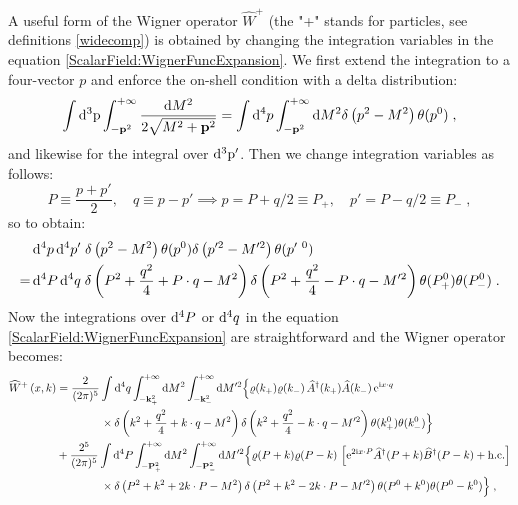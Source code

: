 \documentclass[prd,superscriptaddress,nofootinbib,notitlepage]{revtex4-1}
\def\wA{{\widehat A}}
\def\wA{\widehat A}
\def\wAd{\widehat A^{\dagger}}
\def\wBd{\widehat B^{\dagger}}
\def\wW{\widehat W}
\newcommand{\e}{{\rm e}}
\newcommand{\pp}{{\rm p}}
\newcommand{\di}{{\rm d}}
\newcommand{\ii}{{\rm i}}
\begin{document}
A useful form of the Wigner operator $\wW^+$ (the "+" stands for particles, see definitions \eqref{widecomp}) is obtained by changing 
the integration variables in the equation \eqref{ScalarField:WignerFuncExpansion}. We first extend the integration to a 
four-vector $p$ and enforce the on-shell condition with a delta distribution:
%
\begin{equation*}
    \int\di^3\pp\int^{+\infty}_{-{\bf p}^2}\frac{\di M^2}{2\sqrt{M^2+{\bf p}^2}}=\int\di^4 p
    \int^{+\infty}_{-{\bf p}^2}\di M^2\delta\left(p^2-M^2\right)\theta(p^0)\;,
\end{equation*}
%
and likewise for the integral over $\di^3\pp'$. Then we change integration variables as follows:
%
\begin{equation*}
    P\equiv\frac{p+p'}{2},\quad q\equiv p-p' \implies p=P+q/2 \equiv P_+,\quad p'=P-q/2 \equiv P_-\;,
\end{equation*}
%
so to obtain:
%
\begin{align*}
  & \di^4 p \, \di^4 p' \; \delta\left(p^2-M^2\right)\theta(p^0) \delta\left(p'^2-M'^2\right)\theta(p^{\prime\ 0}) \\
   =\, & \di^4 P \, \di^4 q \; \delta\left(P^2+\frac{q^2}{4}+P\cdot q-M^2\right)\delta\left(P^2+\frac{q^2}{4}
   -P\cdot q-M'^2\right)\theta(P^0_+)\theta(P^0_-)\;.
\end{align*}
%
Now the integrations over $\di^4 P$ or $\di^4 q$ in the equation \eqref{ScalarField:WignerFuncExpansion}
are straightforward and the Wigner operator becomes:
%
\begin{equation*}
    \begin{split}
\wW^+\left(x,k\right)&=\frac{2}{(2\pi)^5}\int\di^4 q\int^{+\infty}_{-{\bf k}^2_+}\di M^2\int^{+\infty}_{-{\bf k}^2_-} \di M^{\prime 2}\Big\{\varrho(k_+)\varrho(k_-) \, \wAd(k_+)\wA(k_-) 
\, \e^{\ii x\cdot q}\\
&\qquad\qquad\times\delta\left(k^2+\frac{q^2}{4}+k\cdot q-M^2\right)\delta\left(k^2+\frac{q^2}{4}-k\cdot q-M^{\prime2}\right)
\theta(k^0_+)\theta(k^0_-)\Big\} \\
&+ \frac{2^5}{(2\pi)^5}\int\di^4 P \int^{+\infty}_{-{\bf P}^2_+}\di M^2\int^{+\infty}_{-{\bf P}^2_-}
\di M^{\prime 2}\Big\{\varrho(P+k)\varrho(P-k) \, \left[\e^{2 \ii x\cdot P}
\wAd(P+k)\wBd(P-k)+ {\rm h. c.}\right]\\
&\qquad\qquad\times \delta\left(P^2+k^2+2 k\cdot P-M^2\right)\delta\left(P^2+k^2-2 k\cdot P-M'^2\right)
\theta(P^0+k^0)\theta(P^0-k^0)\Big\}\;,
\end{split}
\end{equation*}
\end{document}
